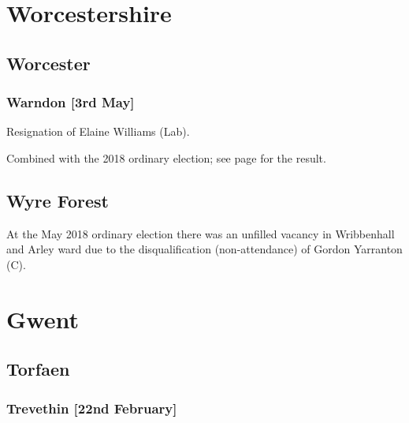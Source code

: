 \documentclass[a4paper,openany]{book}
\begin{document}
\begin{resultsiii}
\section{Worcestershire}

\subsection*{Worcester}

\subsubsection*{Warndon \hspace*{\fill}\nolinebreak[1]%
\enspace\hspace*{\fill}
[3rd May]}


Resignation of Elaine Williams (Lab).

Combined with the 2018 ordinary election; see page \pageref{WarndonWorcester} for the result.

\subsection*{Wyre Forest}

At the May 2018 ordinary election there was an unfilled vacancy in Wribbenhall and Arley ward due to the disqualification (non-attendance) of Gordon Yarranton (C).

\section{Gwent}

\subsection*{Torfaen}

\subsubsection*{Trevethin \hspace*{\fill}\nolinebreak[1]%
\enspace\hspace*{\fill}
[22nd February]}



\end{resultsiii}
\end{document}
